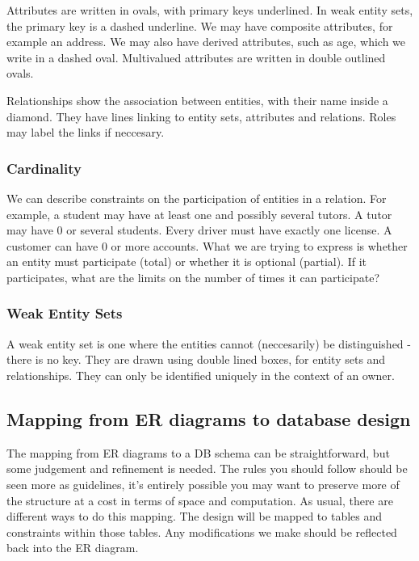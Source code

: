 \documentclass{article}
\begin{document}
	\par
	Attributes are written in ovals, with primary keys underlined. In weak entity sets, the primary key is a dashed underline. We may have composite attributes, for example an address. We may also have derived attributes, such as age, which we write in a dashed oval. Multivalued attributes are written in double outlined ovals. 
	
	\par 
	Relationships show the association between entities, with their name inside a diamond. They have lines linking to entity sets, attributes and relations. Roles may label the links if neccesary. 
	
	\subsubsection{Cardinality}
	We can describe constraints on the participation of entities in a relation. For example, a student may have at least one and possibly several tutors. A tutor may have 0 or several students. Every driver must have exactly one license. A customer can have 0 or more accounts. What we are trying to express is whether an entity must participate (total) or whether it is optional (partial). If it participates, what are the limits on the number of times it can participate? 
	
	\subsubsection{Weak Entity Sets}
	A weak entity set is one where the entities cannot (neccesarily) be distinguished - there is no key. They are drawn using double lined boxes, for entity sets and relationships. They can only be identified uniquely in the context of an owner.
	
	\subsection{Mapping from ER diagrams to database design}
	The mapping from ER diagrams to a DB schema can be straightforward, but some judgement and refinement is needed. The rules you should follow should be seen more as guidelines, it's entirely possible you may want to preserve more of the structure at a cost in terms of space and computation. As usual, there are different ways to do this mapping. The design will be mapped to tables and constraints within those tables. Any modifications we make should be reflected back into the ER diagram.
	
\end{document}
